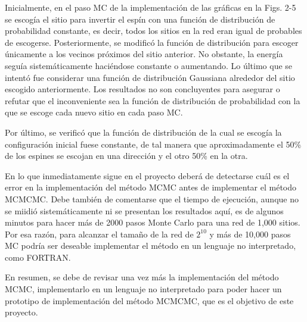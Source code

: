 \documentclass[letterpaper,superscriptaddress,aps,pra,nolongbibliography,twocolumn,showpacs,floatfix,10pt]{revtex4-2} %
\renewcommand{\>}{\rangle}
\newcommand{\<}{\langle}
\begin{document}
Inicialmente, en el paso MC de la implementación de las gráficas en la Figs. 
2-5
se escogía el sitio para invertir el espín con una función de distribución
de probabilidad constante, es decir, todos los sitios en la red eran igual
de probables de escogerse. Posteriormente, se modificó la función de 
distribución para escoger únicamente a los vecinos próximos del sitio
anterior. No obstante, la energía seguía sistemáticamente haciéndose
constante o aumentando. Lo último que se intentó fue considerar una
función de distribución Gaussiana alrededor del sitio escogido anteriormente.
Los resultados no son concluyentes para asegurar o refutar que el 
inconveniente sea la función de distribución de probabilidad con la que 
se escoge cada nuevo sitio en cada paso MC.

Por último, se verificó que la función de distribución de la cual se 
escogía la configuración inicial fuese constante, de tal manera que 
aproximadamente el 50\% de los espines se escojan en una dirección y 
el otro 50\% en la otra.

En lo que inmediatamente sigue en el proyecto deberá de detectarse cuál
es el error en la implementación del método MCMC antes de implementar
el método MCMCMC. Debe también de comentarse que el tiempo de ejecución, 
aunque no se miidió sistemáticamente ni se presentan los resultados aquí,
es de algunos minutos para hacer más de 2000 pasos Monte Carlo para 
una red de 1,000 sitios. Por esa razón, para alcanzar el tamaño de la red
de $2^{10}$ y más de 10,000 pasos MC podría ser deseable implementar 
el método en un lenguaje no interpretado, como FORTRAN.


En resumen, se debe de revisar una vez más la implementación del método
MCMC, implementarlo en un lenguaje no interpretado para poder hacer un 
prototipo de implementación del método MCMCMC, que es el objetivo de 
este proyecto. 

%



\end{document}
